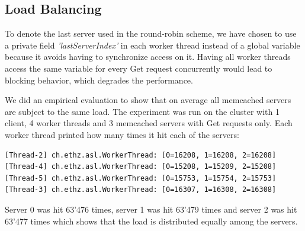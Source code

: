 \subsection{Load Balancing} \label{sub:lb}
To denote the last server used in the round-robin scheme, we have chosen to use a private field \textit{'lastServerIndex'} in each worker thread instead of a global variable because it avoids having to synchronize access on it. Having all worker threads access the same variable for every Get request concurrently would lead to blocking behavior, which degrades the performance. 

We did an empirical evaluation to show that on average all memcached servers are subject to the same load. The experiment was run on the cluster with 1 client, 4 worker threads and 3 memcached servers with Get requests only. Each worker thread printed how many times it hit each of the servers:
\begin{lstlisting}[basicstyle=\tiny]                
[Thread-2] ch.ethz.asl.WorkerThread: [0=16208, 1=16208, 2=16208] 
[Thread-4] ch.ethz.asl.WorkerThread: [0=15208, 1=15209, 2=15208] 
[Thread-5] ch.ethz.asl.WorkerThread: [0=15753, 1=15754, 2=15753] 
[Thread-3] ch.ethz.asl.WorkerThread: [0=16307, 1=16308, 2=16308] 
\end{lstlisting}
Server 0 was hit 63'476 times, server 1 was hit 63'479 times and server 2 was hit 63'477 times which shows that the load is distributed equally among the servers.

